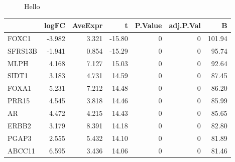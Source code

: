\documentclass[10pt,twocolumn]{article}\usepackage[]{graphicx}\usepackage[]{color}
\newenvironment{knitrout}{}{} %
\begin{document}
\begin{knitrout}
\begin{figure}[ht]
{}

\caption[Hello]{Hello}\label{fig:unnamed-chunk-32}
\end{figure}


\begin{tabular}{lrrrrrr}
\toprule
  & logFC & AveExpr & t & P.Value & adj.P.Val & B\\
\midrule
FOXC1 & -3.982 & 3.321 & -15.80 & 0 & 0 & 101.94\\
SFRS13B & -1.941 & 0.854 & -15.29 & 0 & 0 & 95.74\\
MLPH & 4.168 & 7.127 & 15.03 & 0 & 0 & 92.64\\
SIDT1 & 3.183 & 4.731 & 14.59 & 0 & 0 & 87.45\\
FOXA1 & 5.231 & 7.212 & 14.48 & 0 & 0 & 86.20\\
\addlinespace
PRR15 & 4.545 & 3.818 & 14.46 & 0 & 0 & 85.99\\
AR & 4.472 & 4.215 & 14.43 & 0 & 0 & 85.65\\
ERBB2 & 3.179 & 8.391 & 14.18 & 0 & 0 & 82.80\\
PGAP3 & 2.555 & 5.432 & 14.10 & 0 & 0 & 81.89\\
ABCC11 & 6.595 & 3.436 & 14.06 & 0 & 0 & 81.46\\
\bottomrule
\end{tabular}


\end{knitrout}
\end{document}
